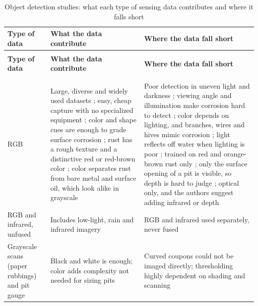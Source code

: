 {\scriptsize
\renewcommand{\arraystretch}{1.15}
\setlength{\tabcolsep}{3pt}
\begin{xltabular}{\textwidth}{>{\RaggedRight\arraybackslash}p{2.4cm}>{\RaggedRight\arraybackslash}X>{\RaggedRight\arraybackslash}X}
\caption{Object detection studies: what each type of sensing data contributes and where it falls short}\label{tab:detection-data}\\
\toprule
\textbf{Type of data} & \textbf{What the data contribute} & \textbf{Where the data fall short} \\
\midrule
\endfirsthead
{}\\
\toprule
\textbf{Type of data} & \textbf{What the data contribute} & \textbf{Where the data fall short} \\
\midrule
\endhead
\midrule{}\\
\endfoot
\bottomrule
{}\\
\endlastfoot
RGB & Large, diverse and widely used datasets \citep{Zhang2024,Srivastava2021}; easy, cheap capture with no specialized equipment \citep{Sun2022,Suzuki2026}; color and shape cues are enough to grade surface corrosion \citep{Li2024b}; rust has a rough texture and a distinctive red or red-brown color \citep{Rahman2021,HerndonTien2025}; color separates rust from bare metal and surface oil, which look alike in grayscale \citep{Hu2023} & Poor detection in uneven light and darkness \citep{Zhang2024,Lalitha2022,Wu2023,Wu2026}; viewing angle and illumination make corrosion hard to detect \citep{Yu2023}; color depends on lighting, and branches, wires and hives mimic corrosion \citep{HerndonTien2025}; light reflects off water when lighting is poor \citep{Hu2023}; trained on red and orange-brown rust only \citep{Rahman2021}; only the surface opening of a pit is visible, so depth is hard to judge \citep{Suzuki2026}; optical only, and the authors suggest adding infrared or depth \citep{Wang2026a} \\
\midrule
RGB and infrared, unfused & Includes low-light, rain and infrared imagery \citep{Zhang2026c} & RGB and infrared used separately, never fused \citep{Zhang2026c} \\
\midrule
Grayscale scans (paper rubbings) and pit gauge & Black and white is enough; color adds complexity not needed for sizing pits \citep{Khodabux2021a} & Curved coupons could not be imaged directly; thresholding highly dependent on shading and scanning \citep{Khodabux2021a} \\

\end{xltabular}}
